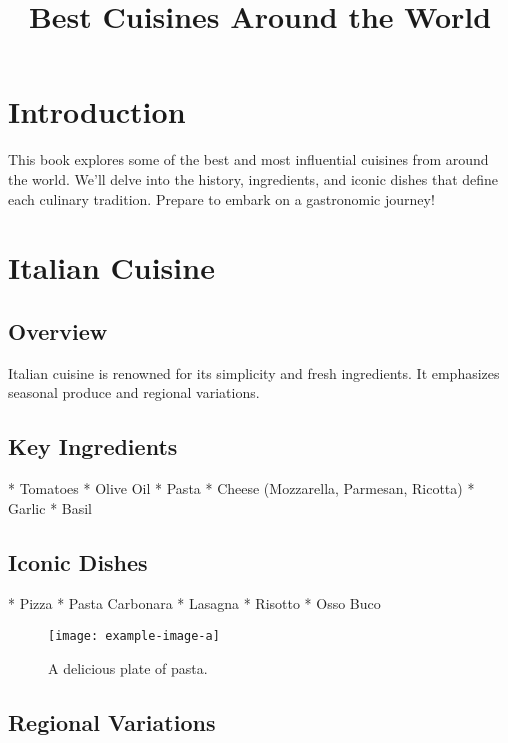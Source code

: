 \documentclass{article}
\title{Best Cuisines Around the World}
\author{}
\date{}
\begin{document}
\maketitle

\tableofcontents

\section{Introduction}

This book explores some of the best and most influential cuisines from around the world.  We'll delve into the history, ingredients, and iconic dishes that define each culinary tradition.  Prepare to embark on a gastronomic journey!

\section{Italian Cuisine}

\subsection{Overview}

Italian cuisine is renowned for its simplicity and fresh ingredients.  It emphasizes seasonal produce and regional variations.

\subsection{Key Ingredients}

*   Tomatoes
*   Olive Oil
*   Pasta
*   Cheese (Mozzarella, Parmesan, Ricotta)
*   Garlic
*   Basil

\subsection{Iconic Dishes}

*   Pizza
*   Pasta Carbonara
*   Lasagna
*   Risotto
*   Osso Buco

\begin{figure}[h!]
\centering
\texttt{[image: example-image-a]} %
\caption{A delicious plate of pasta.}
\end{figure}

\subsection{Regional Variations}
\end{document}
